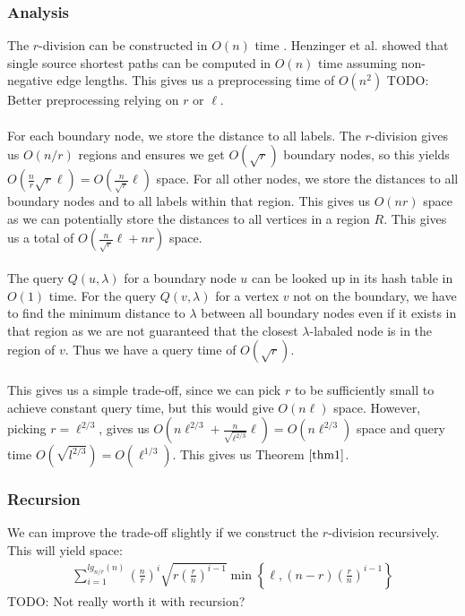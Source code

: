 \subsubsection{Analysis}
The $r$-division can be constructed in $O(n)$ time \cite{klein2013structured}. Henzinger
et al. showed that single source shortest paths can be computed in $O(n)$ time
\cite{henzinger1997faster} assuming non-negative edge lengths. This gives us a
preprocessing time of $O(n^2)$ TODO: Better preprocessing relying on $r$ or $\ell$. \\
\\
For each boundary node, we store the distance to all labels. The $r$-division gives us
$O(n/r)$ regions and ensures we
get $O(\sqrt{r})$ boundary nodes, so this yields
$O(\frac{n}{r}\sqrt{r}\ell)=O(\frac{n}{\sqrt{r}}\ell)$ space. For all other nodes, we
store the distances to all boundary nodes and to all labels within that region. This
gives us $O(nr)$ space as we can potentially store the distances to all vertices in a
region $R$. This gives us a total of $O(\frac{n}{\sqrt{r}}\ell+nr)$ space. \\
\\
The query $Q(u,\lambda)$ for a boundary node $u$ can be looked up in its hash table in
$O(1)$ time. For the query $Q(v,\lambda)$ for a vertex $v$ not on the boundary, we have
to find the minimum distance to $\lambda$ between all boundary nodes even if it exists in
that region as we are not guaranteed that the closest $\lambda$-labaled node is in the
region of $v$. Thus we have a query time of $O(\sqrt{r})$. \\
\\
This gives us a simple trade-off, since we can pick $r$ to be sufficiently small to
achieve constant query time, but this would give $O(n\ell)$ space. However, picking
$r=\ell^{2/3}$, gives us $O(n\ell^{2/3}+\frac{n}{\sqrt{\ell^{2/3}}}\ell)=O(n\ell^{2/3})$
space and query time $O(\sqrt{l^{2/3}})=O(\ell^{1/3})$. This gives us Theorem
$\ref{thm1}$.

\subsubsection{Recursion}
We can improve the trade-off slightly if we construct the $r$-division recursively. This will
yield space:
\begin{align*}
  \sum_{i=1}^{lg_{n/r}(n)} \left(\frac{n}{r}\right)^i
  \sqrt{r\left(\frac{r}{n}\right)^{i-1}} \min
  \left\{\ell,\left(n-r\right)\left(\frac{r}{n}\right)^{i-1}\right\}
\end{align*}
TODO: Not really worth it with recursion?

